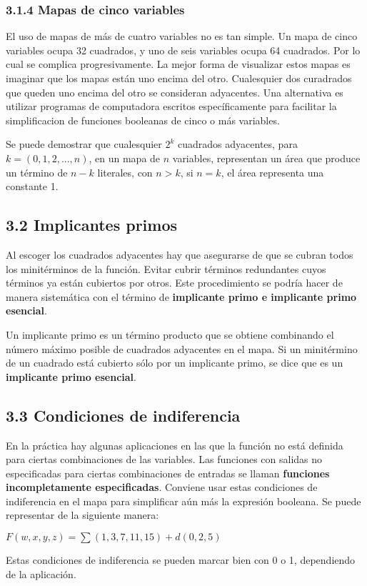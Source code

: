 \subsubsection*{3.1.4 Mapas de cinco variables}
El uso de mapas de m\'{a}s de cuatro variables no es tan simple. Un mapa de cinco variables ocupa 32 cuadrados,
y uno de seis variables ocupa 64 cuadrados. Por lo cual se complica progresivamente.
La mejor forma de visualizar estos mapas es imaginar que los mapas est\'{a}n uno encima del otro.
Cualesquier dos curadrados que queden uno encima del otro se consideran adyacentes.
Una alternativa es utilizar programas de computadora escritos espec\'{i}ficamente para
facilitar la simplificacion de funciones booleanas de cinco o m\'{a}s variables.

Se puede demostrar que cualesquier $2^k$ cuadrados adyacentes, para $k = (0, 1,2, ..., n)$,
en un mapa de $n$ variables, representan un \'{a}rea que produce un t\'{e}rmino de $n - k$
literales, con $n > k$, si $n = k$, el \'{a}rea representa una constante 1.

\subsection*{3.2 Implicantes primos}
Al escoger los cuadrados adyacentes hay que asegurarse de que se cubran todos los minit\'{e}rminos de la funci\'{o}n.
Evitar cubrir t\'{e}rminos redundantes cuyos t\'{e}rminos ya est\'{a}n cubiertos
por otros. Este procedimiento se podr\'{i}a hacer de manera sistem\'{a}tica con
el t\'{e}rmino de \textbf{implicante primo e implicante primo esencial}.

Un implicante primo es un t\'{e}rmino producto que se obtiene combinando el
n\'{u}mero m\'{a}ximo posible de cuadrados adyacentes en el mapa. Si un
minit\'{e}rmino de un cuadrado est\'{a} cubierto s\'{o}lo por un implicante
primo, se dice que es un \textbf{implicante primo esencial}.

\subsection*{3.3 Condiciones de indiferencia}
En la pr\'{a}ctica hay algunas aplicaciones en las que la funci\'{o}n no est\'{a} definida para ciertas
combinaciones de las variables. Las funciones con salidas no especificadas para
ciertas combinaciones de entradas se llaman \textbf{funciones incompletamente especificadas}.
Conviene usar estas condiciones de indiferencia en el mapa para simplificar a\'{u}n m\'{a}s la
expresi\'{o}n booleana. Se puede representar de la siguiente manera:
\begin{center}
    $F(w, x, y, z) = \sum (1, 3, 7, 11, 15) + d(0, 2, 5)$
\end{center}
Estas condiciones de indiferencia se pueden marcar bien
con 0 o 1, dependiendo de la aplicaci\'{o}n.


